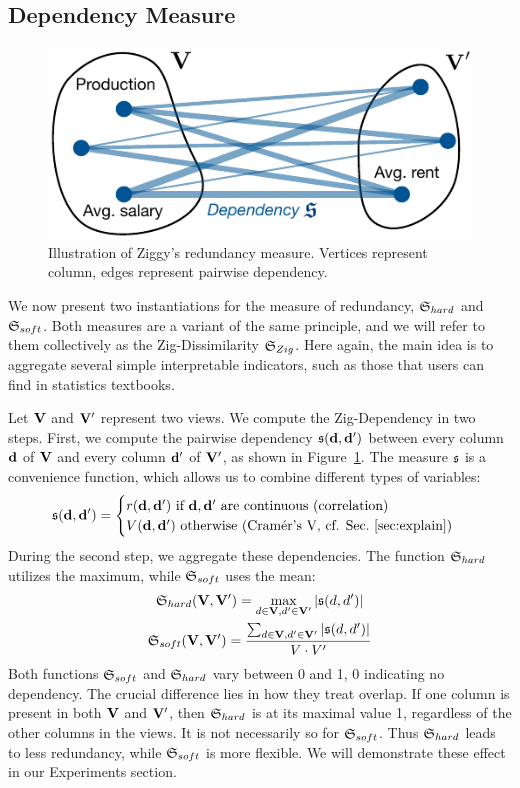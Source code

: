 \subsection{Dependency Measure}
\label{sec:dependency}
\begin{figure}
  \centering
  \includegraphics[width=0.6\columnwidth]{Figures/Redundancy}
  \caption{Illustration of Ziggy's redundancy measure. Vertices represent
  column, edges represent pairwise dependency.}
  \label{pic:redundanct}
\end{figure}
We now present two instantiations for the measure of redundancy,
$\mathfrak{S}_{hard}$ and $\mathfrak{S}_{soft}$.  Both measures are a variant of the same
principle, and we will refer to them collectively as the Zig-Dissimilarity
$\mathfrak{S}_{Zig}$. Here again, the main idea is to aggregate several simple
interpretable indicators, such as those that users can find in statistics
textbooks.

Let  $\mathbf{V}$ and $\mathbf{V}'$ represent two views. We compute the Zig-Dependency
in two steps. First, we compute the pairwise dependency $\mathfrak{s}(\mathbf{d},
\mathbf{d}')$ between every column $\mathbf{d}$ of  $\mathbf{V}$ and every column $\mathbf{d}'$
of $\mathbf{V}'$, as shown in Figure~\ref{pic:redundanct}. The measure $\mathfrak{s}$ is
a convenience function, which allows us to combine different types of
variables:
\begin{equation}
    \mathfrak{s}(\mathbf{d}, \mathbf{d}')= \begin{cases}
        r(\mathbf{d}, \mathbf{d}')\ \text{if $\bf{d}, \bf{d}'$ are continuous (correlation)}\\
        V(\mathbf{d}, \mathbf{d}')\ \text{otherwise (Cram\'er's V, cf.
        Sec.~\ref{sec:explain})}
         \end{cases}
\end{equation}
During the second step, we aggregate these dependencies. The function
$\mathfrak{S}_{hard}$ utilizes the maximum, while $\mathfrak{S}_{soft}$ uses the mean:
\begin{gather}
    \mathfrak{S}_{hard}(\mathbf{V}, \mathbf{V}') = \max_{d \in \mathbf{V}, d' \in \mathbf{V}'} |\mathfrak{s}(d, d')|
    \label{eq:hard}\\
    \mathfrak{S}_{soft}(\mathbf{V}, \mathbf{V}') = 
    \frac{\sum_{d \in \mathbf{V}, d' \in \mathbf{V}'} |\mathfrak{s}(d, d')|}
    {V \cdot V'}
    \label{eq:soft}
\end{gather}
Both functions $\mathfrak{S}_{soft}$ and $\mathfrak{S}_{hard}$ vary between 0 and 1, 0
indicating no dependency. The crucial difference lies in how they treat
overlap. If one column is present in both $\mathbf{V}$ and $\mathbf{V}'$, then
$\mathfrak{S}_{hard}$ is at its maximal value 1, regardless of the other columns in
the views. It is not necessarily so for $\mathfrak{S}_{soft}$. Thus
$\mathfrak{S}_{hard}$ leads to less redundancy, while $\mathfrak{S}_{soft}$ is more
flexible. We will demonstrate these effect in our Experiments section.

